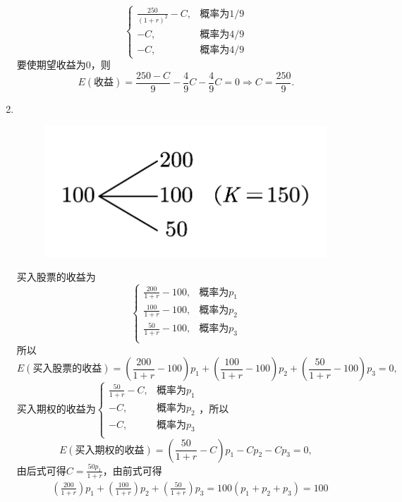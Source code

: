\begin{enumerate}[label=\arabic{section}.\arabic*]
\[\begin{cases}
        \displaystyle\frac{250}{(1+r)^2}-C, & \text{概率为}1/9 \\ -C, & \text{概率为}4/9 \\ -C, & \text{概率为}4/9
    \end{cases}\]
    要使期望收益为0，则
    \[E(\text{收益})=\frac{250-C}{9}-\frac{4}{9}C-\frac{4}{9}C=0 \Rightarrow C=\frac{250}{9}.\]
    \item \sol {\kaishu \textcolor{blue}{注意：也可以参照教材例9.1a的解法.}}\\
    \begin{figure}[H]
        \centering
        \includegraphics[scale=0.35]{6.8.pdf}
    \end{figure}
    买入股票的收益为
    \[\begin{cases}
        \displaystyle\frac{200}{1+r}-100, & \text{概率为}p_1 \\ \displaystyle\frac{100}{1+r}-100, & \text{概率为}p_2 \\ \displaystyle\frac{50}{1+r}-100, & \text{概率为}p_3 \\
    \end{cases}\]
    所以
    \[E(\text{买入股票的收益})=\left(\frac{200}{1+r}-100\right)p_1+\left(\frac{100}{1+r}-100\right)p_2+\left(\frac{50}{1+r}-100\right)p_3=0,\]
    买入期权的收益为$\displaystyle \begin{cases}
        \displaystyle\frac{50}{1+r}-C, & \text{概率为}p_1 \\ -C, & \text{概率为}p_2 \\ -C, & \text{概率为}p_3 \\
    \end{cases}$，所以\[E(\text{买入期权的收益})=\left(\frac{50}{1+r}-C\right)p_1-Cp_2-Cp_3=0,\]
    由后式可得$\displaystyle C=\frac{50p_1}{1+r}$，由前式可得
    \begin{align*}
        &\left(\frac{200}{1+r}\right)p_1+\left(\frac{100}{1+r}\right)p_2+\left(\frac{50}{1+r}\right)p_3=100(p_1+p_2+p_3)=100\\

\end{align*}
\end{enumerate}
